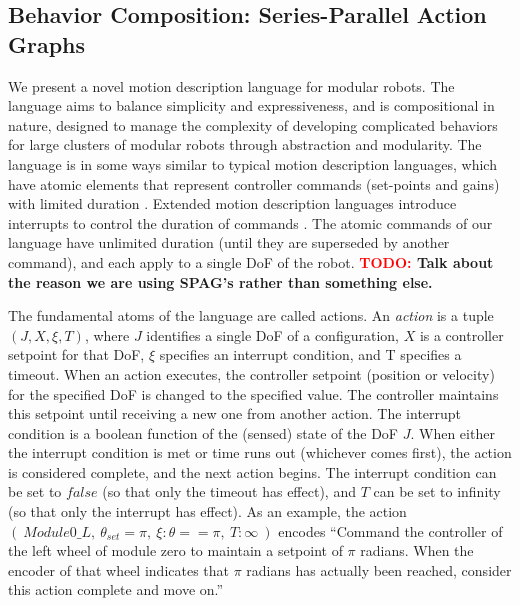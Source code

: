 \documentclass[conference]{IEEEtran}
\theoremstyle{definition}
\newcommand{\TODO}[1]{ {\bf \textcolor{red}{TODO:} #1 }}
\begin{document}
\subsection{Behavior Composition: Series-Parallel Action Graphs}
\label{sec:behavior-representation}
We present a novel motion description language for modular robots.  The
language aims to balance simplicity and expressiveness, and is compositional in
nature, designed to manage the complexity of developing complicated behaviors
for large clusters of modular robots through abstraction and modularity. 
The language is in some ways similar to typical motion description languages, which have atomic elements that represent controller
commands (set-points and gains) with limited duration \cite{brockett1988computer}.
Extended motion description languages introduce interrupts to control the duration
of commands \cite{hristu2003motion}.  The atomic commands of our language have unlimited
duration (until they are superseded by another command), and each apply to a single
DoF of the robot.
\TODO{Talk about the reason we are using SPAG's rather than something
else.}

 The fundamental atoms of the language are called actions.  An \textit{action} is a tuple \(
(J, X, \xi, T)\), where \(J\) identifies a single DoF of a configuration, \(X\) is a
controller setpoint for that DoF, \(\xi\) specifies an interrupt
condition, and T specifies a timeout. When an action executes, the controller
setpoint (position or velocity) for the specified DoF is changed to the specified
value. The controller maintains this setpoint until receiving a new one from another
action. The interrupt condition is a boolean function of the (sensed) state of the DoF \(J\).
When either the interrupt condition is met or time runs out (whichever comes
first), the action is considered complete, and the next action  begins. The
interrupt condition can be set to \(false\) (so that only the timeout has effect),
and \(T\) can be set to infinity (so that only the interrupt has effect). As an example,
the action \((~Module0\_L,~ \theta_{set}=\pi,~ \xi:\theta==\pi,~T:\infty~)\) encodes
``Command the controller of the left wheel of module zero to maintain a setpoint
of \(\pi\) radians.  When the encoder of that wheel indicates that \(\pi\) radians
has actually been reached, consider this action complete and move on.''
 
\end{document}

